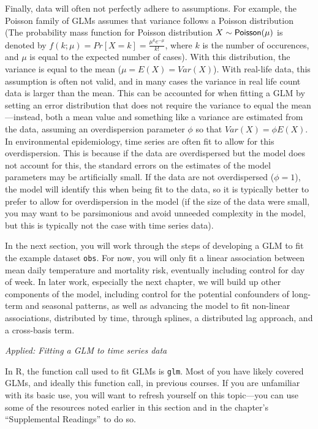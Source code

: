 \documentclass[
]{book}
\begin{document}
Finally, data will often not perfectly adhere to assumptions. For example, the
Poisson family of GLMs assumes that variance follows a Poisson distribution
(The probability mass function for Poisson distribution \(X \sim {\sf Poisson}(\mu)\) is denoted by \(f(k;\mu)=Pr[X=k]= \displaystyle \frac{\mu^{k}e^{-\mu}}{k!}\), where
\(k\) is the number of occurences, and \(\mu\) is equal to the expected number of
cases). With this distribution, the variance is equal to the mean (\(\mu=E(X)=Var(X)\)). With real-life data, this assumption is often not valid, and in many cases the variance in real life count data is larger than the mean. This can be accounted for when fitting a GLM by setting an error distribution that does not require the variance to equal the mean---instead, both a mean value and something like a
variance are estimated from the data, assuming an overdispersion parameter \(\phi\)
so that \(Var(X)=\phi E(X)\). In environmental epidemiology, time series
are often fit to allow for this overdispersion. This is because if the data are overdispersed but the model does not account for this, the standard errors on the
estimates of the model parameters may be artificially small. If the data are not overdispersed (\(\phi=1\)), the model will identify this when being fit to the data,
so it is typically better to prefer to allow for overdispersion in the model
(if the size of the data were small, you may want to be parsimonious and avoid
unneeded complexity in the model, but this is typically not the case with time
series data).

In the next section, you will work through the steps of developing a GLM to fit
the example dataset \texttt{obs}. For now, you will only fit a linear association
between mean daily temperature and mortality risk, eventually including control
for day of week. In later work, especially the next chapter, we will build up
other components of the model, including control for the potential confounders
of long-term and seasonal patterns, as well as advancing the model to fit
non-linear associations, distributed by time, through splines, a distributed lag
approach, and a cross-basis term.

\emph{Applied: Fitting a GLM to time series data}

In R, the function call used to fit GLMs is \texttt{glm}. Most of you have likely
covered GLMs, and ideally this function call, in previous courses. If you are
unfamiliar with its basic use, you will want to refresh yourself on this
topic---you can use some of the resources noted earlier in this section and in
the chapter's ``Supplemental Readings'' to do so.
\end{document}
